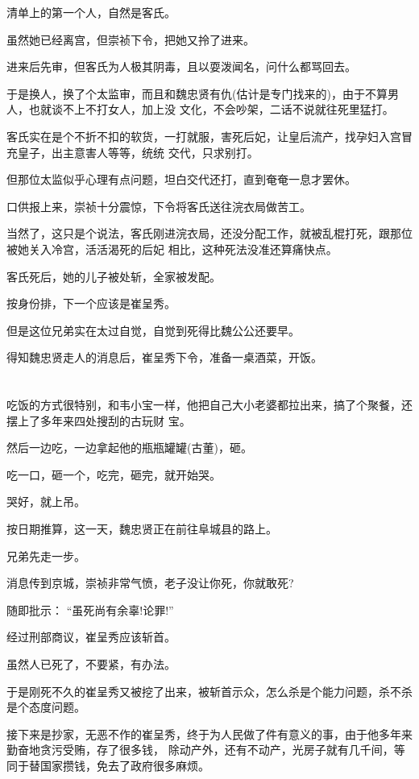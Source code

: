 \documentclass[11pt,a4paper,onecolumn]{article}
\begin{document}
清单上的第一个人，自然是客氏。

虽然她已经离宫，但崇祯下令，把她又拎了进来。

进来后先审，但客氏为人极其阴毒，且以耍泼闻名，问什么都骂回去。

于是换人，换了个太监审，而且和魏忠贤有仇(估计是专门找来的)，由于不算男人，也就谈不上不打女人，加上没
文化，不会吵架，二话不说就往死里猛打。

客氏实在是个不折不扣的软货，一打就服，害死后妃，让皇后流产，找孕妇入宫冒充皇子，出主意害人等等，统统
交代，只求别打。

但那位太监似乎心理有点问题，坦白交代还打，直到奄奄一息才罢休。

口供报上来，崇祯十分震惊，下令将客氏送往浣衣局做苦工。

当然了，这只是个说法，客氏刚进浣衣局，还没分配工作，就被乱棍打死，跟那位被她关入冷宫，活活渴死的后妃
相比，这种死法没准还算痛快点。

客氏死后，她的儿子被处斩，全家被发配。

按身份排，下一个应该是崔呈秀。

但是这位兄弟实在太过自觉，自觉到死得比魏公公还要早。

得知魏忠贤走人的消息后，崔呈秀下令，准备一桌酒菜，开饭。

\section[\thesection]{}

吃饭的方式很特别，和韦小宝一样，他把自己大小老婆都拉出来，搞了个聚餐，还摆上了多年来四处搜刮的古玩财
宝。

然后一边吃，一边拿起他的瓶瓶罐罐(古董)，砸。

吃一口，砸一个，吃完，砸完，就开始哭。

哭好，就上吊。

按日期推算，这一天，魏忠贤正在前往阜城县的路上。

兄弟先走一步。

消息传到京城，崇祯非常气愤，老子没让你死，你就敢死?

随即批示： ``虽死尚有余辜!论罪!''

经过刑部商议，崔呈秀应该斩首。

虽然人已死了，不要紧，有办法。

于是刚死不久的崔呈秀又被挖了出来，被斩首示众，怎么杀是个能力问题，杀不杀是个态度问题。

接下来是抄家，无恶不作的崔呈秀，终于为人民做了件有意义的事，由于他多年来勤奋地贪污受贿，存了很多钱，
除动产外，还有不动产，光房子就有几千间，等同于替国家攒钱，免去了政府很多麻烦。
\end{document}
